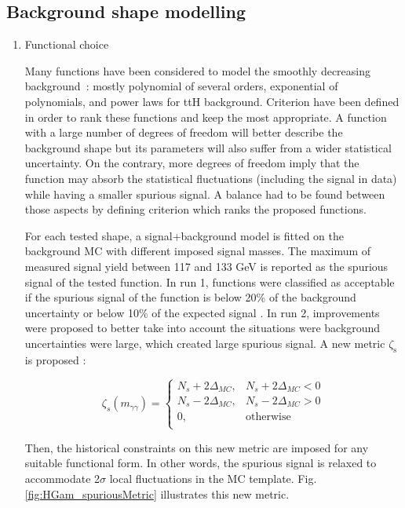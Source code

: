 \subsection{Background shape modelling}
\label{sec:orgfec0702}
\begin{enumerate}
\item Functional choice
  \label{sec:org56079de}

Many functions have been considered to model the smoothly decreasing background~: mostly polynomial of several orders,  exponential of polynomials, and power laws for ttH background.
Criterion have been defined in order to rank these functions and keep the most appropriate.
A function with a large number of degrees of freedom will better describe the background shape but its parameters will also suffer from a wider statistical uncertainty.
On the contrary, more degrees of freedom imply that the function may absorb the statistical fluctuations (including the signal in data) while having a smaller spurious signal.
A balance had to be found between those aspects by defining criterion which ranks the proposed functions.

For each tested shape, a signal+background model is fitted on the background MC with different imposed signal masses.
The maximum of measured signal yield between 117 and 133 GeV is reported as the spurious signal of the tested function.
In run 1, functions were classified as acceptable if the spurious signal of the function is below 20\% of the background uncertainty or below 10\% of the expected signal \cite{ATLAS-CONF-2012-091}.
In run 2, improvements were proposed \cite{ATL-COM-PHYS-2016-1784} to better take into account the situations were background uncertainties were large, which created large spurious signal.
A new metric \(\zeta_{\text{s}}\) is proposed :

\begin{equation}
\zeta_{s}(m_{\gamma\gamma}) =
\left\{
\begin{array}{ll}
N_s + 2\Delta_{MC},   &   N_s + 2\Delta_{MC} < 0 \\
N_s - 2\Delta_{MC},   &   N_s - 2\Delta_{MC} > 0 \\
0                   ,&\text{otherwise}          \\
\end{array}
\right.
\label{eq:relaxed_spurious_signal}
\end{equation}

Then, the historical constraints on this new metric are imposed for any suitable functional form.
In other words, the spurious signal is relaxed to accommodate 2$\sigma$ local fluctuations in the MC template.
Fig. \ref{fig:HGam_spuriousMetric} illustrates this new metric.


\end{enumerate}
